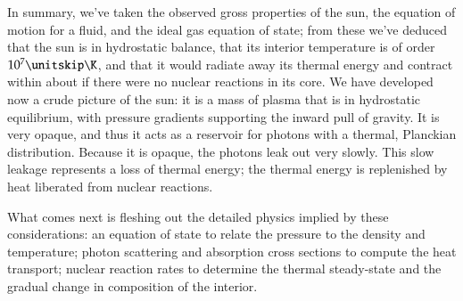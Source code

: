 In summary, we've taken the observed gross properties of the sun, the equation of motion for a fluid, and the ideal gas equation of state; from these we've deduced that the sun is in hydrostatic balance, that its interior temperature is of order $10^{7}\nsp\K$, and that it would radiate away its thermal energy and contract within about  if there were no nuclear reactions in its core.  We have developed now a crude picture of the sun: it is a mass of plasma that is in hydrostatic equilibrium, with pressure gradients supporting the inward pull of gravity.  It is very opaque, and thus it acts as a reservoir for photons with a thermal, Planckian distribution. Because it is opaque, the photons leak out very slowly.  This slow leakage represents a loss of thermal energy; the thermal energy is replenished by heat liberated from nuclear reactions.

What comes next is fleshing out the detailed physics implied by these considerations: an equation of state to relate the pressure to the density and temperature; photon scattering and absorption cross sections to compute the heat transport; nuclear reaction rates to determine the thermal steady-state and the gradual change in composition of the interior.


